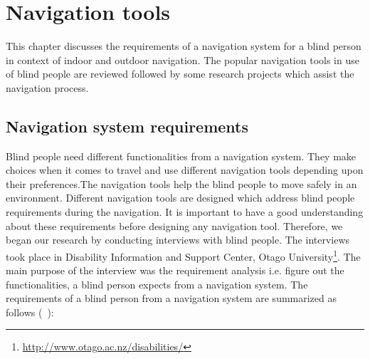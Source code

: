 \chapter{Navigation tools}
\label{chap:navtools}


This chapter discusses the requirements 
of a navigation system for a blind person 
in context of indoor and outdoor navigation. 
The popular navigation tools in use of
blind people are reviewed followed by 
some research projects which assist the 
navigation process.


\section{Navigation system requirements}
\label{sec:nsr}

Blind people need different functionalities from 
a navigation system. They make choices when it comes to travel and 
use different navigation tools depending upon their 
preferences.The navigation tools help the 
blind people to move safely in an environment. 
Different navigation tools are designed 
which address blind people requirements 
during the navigation. It is important to have a 
good understanding about these requirements 
before designing any navigation tool. 
Therefore, we began our research by conducting interviews 
with blind people. The interviews took place 
in Disability Information and Support Center, Otago 
University\footnote{\url{http://www.otago.ac.nz/disabilities/}}. 
The main purpose of the interview was the 
 requirement analysis i.e. figure out the 
functionalities, a blind person expects  from 
a navigation system. The requirements of a blind 
person from a navigation system 
are summarized as follows (~\citet{interview10}): 

